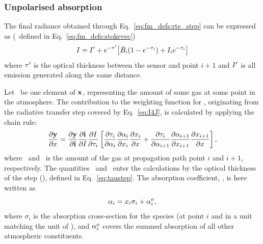 \subsubsection{Unpolarised absorption}
%
The final radiance obtained through Eq.~\ref{eq:fm_defs:rte_step} can be
expressed as (\StoI\ defined in Eq.~\ref{eq:fm_defs:stokevec})
\begin{equation}
  \label{eq:I4J}
  I = I'+ e^{-\tau'}\!\left[ \bar{B}_i(1-e^{-\tau_{i}}) + 
                                         I_{i}e^{-\tau_{i}} \right]
\end{equation}
where $\tau'$ is the optical thickness between the sensor and point $i+1$ and
$I'$ is all emission generated along the same distance.

Let \SttElm\ be one element of $\mathbf{x}$, representing the amount of
some gas at some point in the atmosphere. The contribution to the weighting
function for \SttElm, originating from the radiative transfer step covered by
Eq.~\ref{eq:I4J}, is calculated by applying the chain rule:
\begin{equation}
  \label{eq:chainrule1}
  \frac{\partial\mathbf{y}}{\partial x} =  
  \frac{\partial\mathbf{y}}{\partial\mathbf{i}}
  \frac{\partial\mathbf{i}}{\partial I} 
  \frac{\partial I}{\partial\tau_{i}}
  \left[ \frac{\partial\tau_{i}}{\partial{\alpha}_{i}}
         \frac{\partial{\alpha}_{i}}{\partial x_{i}} 
         \frac{\partial x_{i}}{\partial x} +
         \frac{\partial\tau_{i}}{\partial{\alpha}_{i+1}}
         \frac{\partial{\alpha}_{i+1}}{\partial x_{i+1}}
         \frac{\partial x_{i+1}}{\partial x} 
  \right],
\end{equation}
where \ and \ is the amount of the gas at propagation
path point $i$ and $i+1$, respectively. The quantities \ and
\ enter the calculations by the optical thickness of the step
(), defined in Eq.~\ref{eq:taustep}. The absorption coefficient,
, is here written as
\begin{equation}
  \label{eq:wfuns:crossec1}
  {\alpha}_{i} = x_{i}\sigma_i + {\alpha}_{i}^o,
\end{equation}
where $\sigma_i$ is the absorption cross-section for the species (at point $i$
and in a unit matching the unit of \SttElm), and ${\alpha}_{i}^o$ covers the
summed absorption of all other atmospheric constituents.

